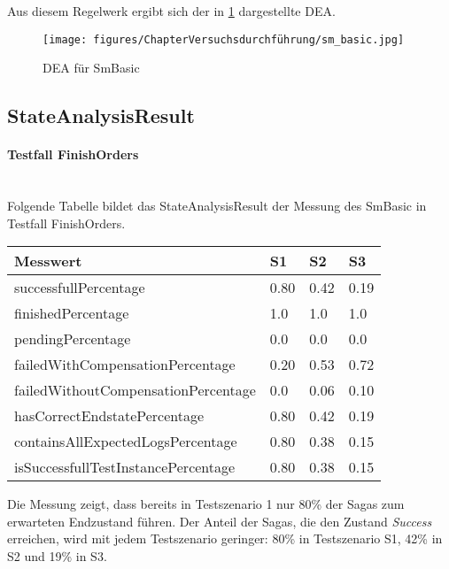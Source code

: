 Aus diesem Regelwerk ergibt sich der in \cref{fig:fig_sm_basic} dargestellte DEA. 

\begin{figure}[H]
	\centering
	\texttt{[image: figures/ChapterVersuchsdurchführung/sm\_basic.jpg]}
	\caption{DEA für SmBasic}
	\label{fig:fig_sm_basic}
\end{figure}
\FloatBarrier

\subsection{StateAnalysisResult}

\paragraph*{Testfall FinishOrders} \mbox{}\\
Folgende Tabelle bildet das StateAnalysisResult der Messung des SmBasic in Testfall FinishOrders.

\begin{center}
	\fontsize{9}{12}\selectfont
	\begin{longtable}[h]{|p{5cm}|p{1cm}|p{1cm}|p{1cm}|}
		\hline
		Messwert & S1 & S2 & S3 \\ \hline
		\endhead
		\endfoot
		successfull\-Percentage & 0.80 & 0.42 & 0.19 \\ \hline
		finished\-Percentage & 1.0 & 1.0 & 1.0 \\ \hline
		pending\-Percentage & 0.0 & 0.0 & 0.0 \\ \hline
		failedWithCompensation\-Percentage & 0.20 & 0.53 & 0.72 \\ \hline
		failedWithoutCompensation\-Percentage & 0.0 & 0.06 & 0.10 \\ \hline
		hasCorrectEndstate\-Percentage & 0.80 & 0.42 & 0.19 \\ \hline
		containsAllExpectedLogs\-Percentage & 0.80 & 0.38 & 0.15 \\ \hline
		isSuccessfullTestInstance\-Percentage & 0.80 & 0.38 & 0.15 \\ \hline
	\end{longtable}
\end{center}
\FloatBarrier

Die Messung zeigt, dass bereits in Testszenario 1 nur 80\% der Sagas zum erwarteten Endzustand führen. Der Anteil der Sagas, die den Zustand \textit{Success} erreichen, wird mit jedem Testszenario geringer: 80\% in Testszenario S1, 42\% in S2 und 19\% in S3.


